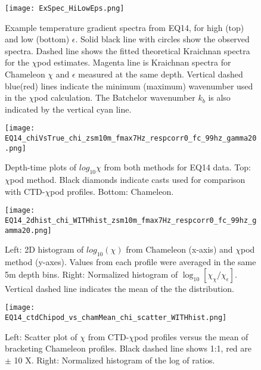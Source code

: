 \documentclass{ametsoc}
\providecommand{\DIFaddendFL}{} %
\begin{document}
\begin{figure}[t]
  \noindent\DIFaddendFL \texttt{[image: ExSpec\_HiLowEps.png]}\\
  \caption{Example temperature gradient spectra from EQ14, for high (top) and low (bottom) $\epsilon$. Solid black line with circles show the observed spectra. Dashed line shows the fitted theoretical Kraichnan spectra for the $\chi$pod estimates. Magenta line is Kraichnan spectra for Chameleon $\chi$ and $\epsilon$ measured at the same depth. Vertical dashed blue(red) lines indicate the minimum (maximum) wavenumber used in the $\chi$pod calculation. The Batchelor wavenumber $k_b$ is also indicated by the vertical cyan line.}
  \label{specexamp}
\end{figure}


\begin{figure}[t]
  \noindent\texttt{[image: EQ14\_chiVsTrue\_chi\_zsm10m\_fmax7Hz\_respcorr0\_fc\_99hz\_gamma20.png]}\\
  \caption{Depth-time plots of $log_{10}\chi$ from both methods for EQ14 data. Top: $\chi$pod method. Black diamonds indicate casts used for comparison with CTD-$\chi$pod profiles. Bottom: Chameleon.}
  \label{eq14_eps_pcolor}
\end{figure}


\begin{figure}[t]
  \noindent\texttt{[image: EQ14\_2dhist\_chi\_WITHhist\_zsm10m\_fmax7Hz\_respcorr0\_fc\_99hz\_gamma20.png]}\\
  \caption{Left: 2D histogram of $log_{10}(\chi)$ from Chameleon (x-axis) and $\chi$pod method (y-axes). Values from each profile were averaged in the same 5m depth bins. Right: Normalized histogram of $\log_{10}[\chi_{\chi}/\chi_{\epsilon}]$. Vertical dashed line indicates the mean of the the distribution.}
  \label{eq14_chi_2dhist}
\end{figure}


\begin{figure}[t]
  \noindent\texttt{[image: EQ14\_ctdChipod\_vs\_chamMean\_chi\_scatter\_WITHhist.png]}\\
  \caption{Left: Scatter plot of $\chi$ from CTD-$\chi$pod profiles versus the mean of bracketing Chameleon profiles. Black dashed line shows 1:1, red are $\pm$ 10 X. Right: Normalized histogram of the log of ratios.}
  \label{eq14_cdtChi_vs_cham}
\end{figure}
\end{document}
